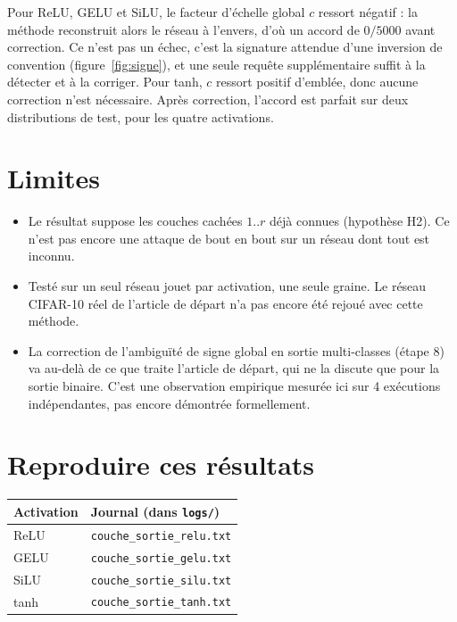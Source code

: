 \documentclass[11pt]{article}
\begin{document}
Pour ReLU, GELU et SiLU, le facteur d'échelle global $c$ ressort négatif :
la méthode reconstruit alors le réseau à l'envers, d'où un accord de
$0/5000$ avant correction. Ce n'est pas un échec, c'est la signature
attendue d'une inversion de convention (figure~\ref{fig:signe}), et une
seule requête supplémentaire suffit à la détecter et à la corriger. Pour
tanh, $c$ ressort positif d'emblée, donc aucune correction n'est
nécessaire. Après correction, l'accord est parfait sur deux distributions
de test, pour les quatre activations.

\section{Limites}

\begin{itemize}
  \item Le résultat suppose les couches cachées $1..r$ déjà connues
    (hypothèse H2). Ce n'est pas encore une attaque de bout en bout sur un
    réseau dont tout est inconnu.
  \item Testé sur un seul réseau jouet par activation, une seule graine. Le
    réseau CIFAR-10 réel de l'article de départ n'a pas encore été rejoué
    avec cette méthode.
  \item La correction de l'ambiguïté de signe global en sortie multi-classes
    (étape 8) va au-delà de ce que traite l'article de départ, qui ne la
    discute que pour la sortie binaire. C'est une observation empirique
    mesurée ici sur 4 exécutions indépendantes, pas encore démontrée
    formellement.
\end{itemize}

\section{Reproduire ces résultats}

\begin{center}
\begin{tabular}{ll}
\toprule
Activation & Journal (dans \texttt{logs/}) \\
\midrule
ReLU & \texttt{couche\_sortie\_relu.txt} \\
GELU & \texttt{couche\_sortie\_gelu.txt} \\
SiLU & \texttt{couche\_sortie\_silu.txt} \\
tanh & \texttt{couche\_sortie\_tanh.txt} \\
\bottomrule
\end{tabular}
\end{center}
\end{document}
